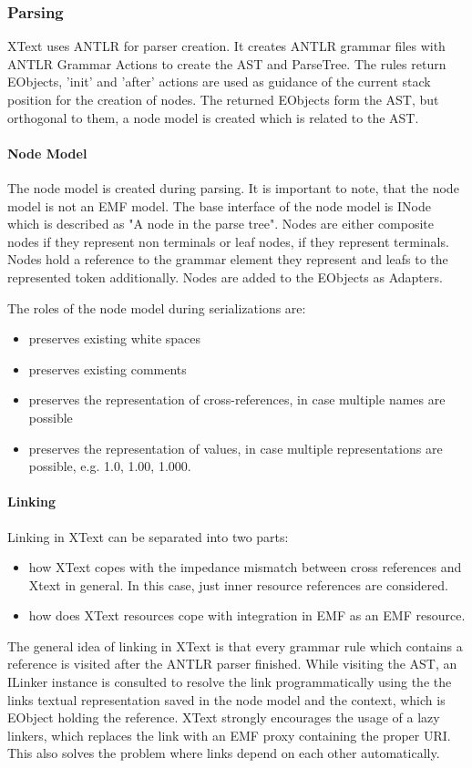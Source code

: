 \subsubsection{Parsing}
XText uses ANTLR \cite{ANTLR} for parser creation. It creates ANTLR grammar files with ANTLR Grammar Actions to create the AST and ParseTree. The rules return EObjects, 'init' and 'after' actions are used as guidance of the current stack position for the creation of nodes. The returned EObjects form the AST, but orthogonal to them, a node model is created which is related to the AST. 

\paragraph{Node Model}
The node model is created during parsing. It is important to note, that the node model is not an EMF model. The base interface of the node model is INode which  is described as "A node in the parse tree"\cite{XTextAPI}. Nodes are either composite nodes if they represent non terminals or leaf nodes, if they represent terminals. Nodes hold a reference to the grammar element they represent and leafs to the represented token additionally. Nodes are added to the EObjects as Adapters.

The roles of the node model during serializations are:
\begin{itemize}
	\item preserves existing white spaces
	\item preserves existing comments
	\item preserves the representation of cross-references, in case multiple names are possible
	\item preserves the representation of values, in case multiple representations are possible, e.g. 1.0, 1.00, 1.000.
\end{itemize}

\paragraph{Linking}
\label{sec:xtextarch:Linking}
Linking in XText can be separated into two parts:
\begin{itemize}
	\item how XText copes with the impedance mismatch between cross references and Xtext in general. In this case, just inner resource references are considered. 
	\item how does XText resources cope with integration in EMF as an EMF resource.
\end{itemize}
The general idea of linking in XText is that every grammar rule which contains a reference is visited after the ANTLR parser finished. While visiting the AST, an ILinker instance is consulted to resolve the link programmatically using the the links textual representation saved in the node model and the context, which is EObject holding the reference. XText strongly encourages the usage of a lazy linkers, which replaces the link with an EMF proxy containing the proper URI. This also solves the problem where links depend on each other automatically.

